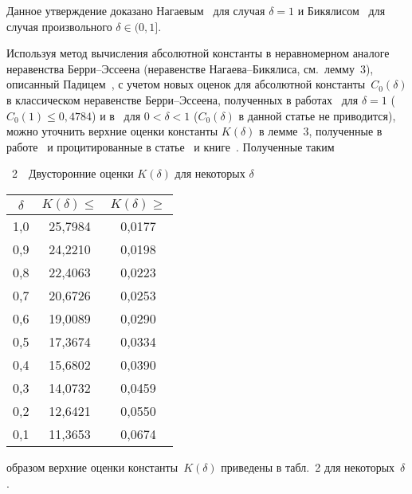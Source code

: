 \begin{multicols}{2}
  \smallskip

  Данное утверждение доказано Нагаевым~\cite{N1965} для случая
$\delta=1$ и Бикялисом~\cite{B1966} для случая произвольного
$\delta\in(0,1]$.

  \medskip

  Используя метод вычисления абсолютной константы в
неравномерном аналоге неравенства Бер\-ри--Эс\-се\-ена (неравенстве
На\-га\-ева--Би\-кя\-ли\-са, см.\ лемму~3), описанный
Падицем~\cite{Paditz1989}, с учетом новых оценок для
абсолютной константы~$C_0(\delta)$ в классическом неравенстве
Бер\-ри--Эс\-се\-ена, полученных в  работах~\cite{KSOPPM2010, KSSAJ2010}
для $\delta=1$ ($C_0(1)\le0{,}4784$) и в~\cite{GS2010} для
$0<\delta<1$ ($C_0(\delta)$ в данной статье не приводится), можно
уточнить верхние оценки константы $K(\delta)$ в
 лемме~3,
полученные в работе~\cite{PaditzTysiak1990} и процитированные в
статье~\cite{Paditz1996} и книге~\cite{KBS2007}. Полученные таким\linebreak
\noindent
\begin{center}
\parbox{50mm}{{{\tablename~2}\ \ \small{Двусторонние оценки $K(\delta)$ для некоторых
$\delta$}}

}

\vspace*{6pt}

{\small 
\tabcolsep=12pt
\begin{tabular}{|c|c|c|}
\hline 
  $\delta$ & $K(\delta)\le$ & $K(\delta)\ge$ \\
\hline
1{,}0 & 25{,}7984 & 0{,}0177\\
0{,}9 & 24{,}2210 & 0{,}0198\\
0{,}8 & 22{,}4063 & 0{,}0223\\
0{,}7 & 20{,}6726 & 0{,}0253\\
0{,}6 & 19{,}0089 & 0{,}0290\\
0{,}5 & 17{,}3674 & 0{,}0334\\
0{,}4 & 15{,}6802 & 0{,}0390\\
0{,}3 & 14{,}0732 & 0{,}0459\\
0{,}2 & 12{,}6421 & 0{,}0550\\
0{,}1 & 11{,}3653 & 0{,}0674\\
\hline
\end{tabular}
}
\end{center}
\vspace*{-6pt}
\columnbreak



\noindent
образом верхние оценки константы~$K(\delta)$ приведены в табл.~2
для некоторых~$\delta$.



\end{multicols}
